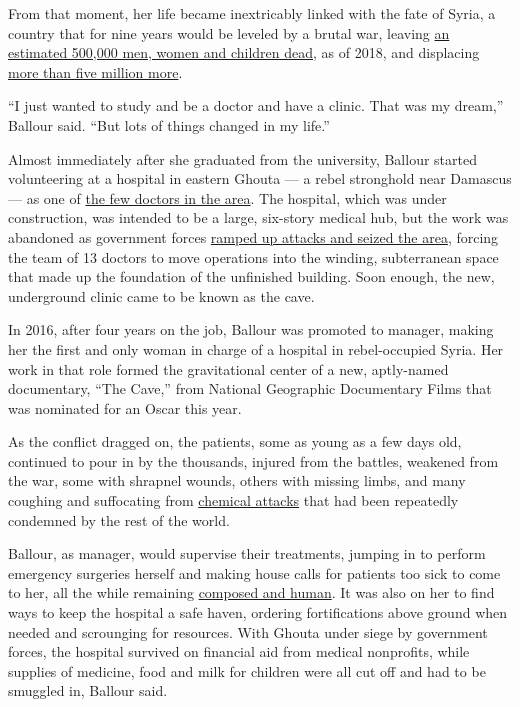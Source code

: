 From that moment, her life became inextricably linked with the fate of
Syria, a country that for nine years would be leveled by a brutal war,
leaving
\href{https://www.hrw.org/world-report/2019/country-chapters/syria}{an
estimated 500,000 men, women and children dead}, as of 2018, and
displacing
\href{https://data2.unhcr.org/en/situations/syria\#_ga=2.119637504.960870915.1580872645-354387927.1580872645}{more
than five million more}.

``I just wanted to study and be a doctor and have a clinic. That was my
dream,'' Ballour said. ``But lots of things changed in my life.''

Almost immediately after she graduated from the university, Ballour
started volunteering at a hospital in eastern Ghouta --- a rebel
stronghold near Damascus --- as one of
\href{https://www.nytimes.com/2019/12/20/world/middleeast/syria-medical-criminalization.html}{the
few doctors in the area}. The hospital, which was under construction,
was intended to be a large, six-story medical hub, but the work was
abandoned as government forces
\href{https://www.cnn.com/2018/04/11/middleeast/inside-eastern-ghouta-syria-intl/index.html}{ramped
up attacks and seized the area}, forcing the team of 13 doctors to move
operations into the winding, subterranean space that made up the
foundation of the unfinished building. Soon enough, the new, underground
clinic came to be known as the cave.

In 2016, after four years on the job, Ballour was promoted to manager,
making her the first and only woman in charge of a hospital in
rebel-occupied Syria. Her work in that role formed the gravitational
center of a new, aptly-named documentary, ``The Cave,'' from National
Geographic Documentary Films that was nominated for an Oscar this year.

As the conflict dragged on, the patients, some as young as a few days
old, continued to pour in by the thousands, injured from the battles,
weakened from the war, some with shrapnel wounds, others with missing
limbs, and many coughing and suffocating from
\href{https://www.nytimes.com/2018/04/08/world/middleeast/syria-chemical-attack-ghouta.html}{chemical
attacks} that had been repeatedly condemned by the rest of the world.

Ballour, as manager, would supervise their treatments, jumping in to
perform emergency surgeries herself and making house calls for patients
too sick to come to her, all the while remaining
\href{https://www.facebook.com/amer.almohibany/videos/1924624087851286/?t=104}{composed
and human}. It was also on her to find ways to keep the hospital a safe
haven, ordering fortifications above ground when needed and scrounging
for resources. With Ghouta under siege by government forces, the
hospital survived on financial aid from medical nonprofits, while
supplies of medicine, food and milk for children were all cut off and
had to be smuggled in, Ballour said.


